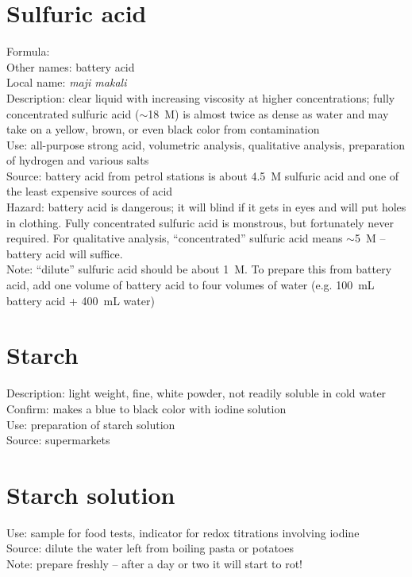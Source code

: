 \section{Sulfuric acid}
Formula: \\
Other names: battery acid\\
Local name: \textit{maji makali}\\
Description: clear liquid with increasing viscosity at higher concentrations; 
fully concentrated sulfuric acid ($\sim$18~M) is almost twice as dense as water 
and may take on a yellow, 
brown, 
or even black color from contamination\\
Use: all-purpose strong acid, 
volumetric analysis, 
qualitative analysis, 
preparation of hydrogen and various salts\\
Source: battery acid from petrol stations 
is about 4.5~M sulfuric acid and one of the least expensive sources of acid\\
Hazard: battery acid is dangerous; 
it will blind if it gets in eyes and will put holes in clothing. 
Fully concentrated sulfuric acid is monstrous, 
but fortunately never required. 
For qualitative analysis, 
``concentrated'' sulfuric acid means $\sim$5~M -- battery acid will suffice.\\
Note: ``dilute'' sulfuric acid should be about 1~M. 
To prepare this from battery acid, 
add one volume of battery acid to four volumes of water (e.g. 
100~mL battery acid + 400~mL water)

\section{Starch}
Description: light weight, 
fine, 
white powder, 
not readily soluble in cold water\\
Confirm: makes a blue to black color with iodine solution\\
Use: preparation of starch solution\\
Source: supermarkets

\section{Starch solution}
Use: sample for food tests, 
indicator for redox titrations involving iodine\\
Source: dilute the water left from boiling pasta or potatoes\\
Note: prepare freshly -- after a day or two it will start to rot!


